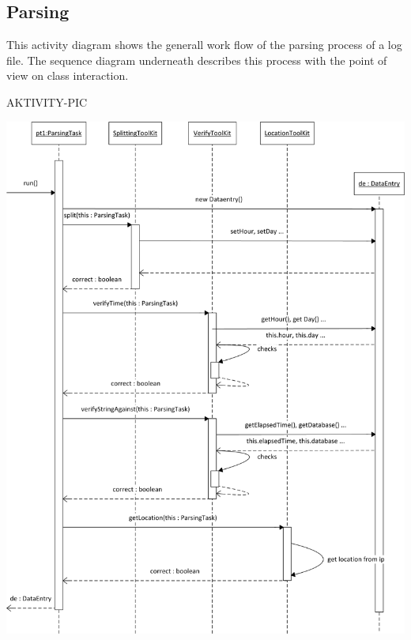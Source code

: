 \newpage 

\subsection{Parsing} 
This activity diagram shows the generall work flow of the parsing process of a log file. 
The sequence diagram underneath describes this process with the point of view on class interaction.

AKTIVITY-PIC

\begin{center}
\includegraphics[width=0.7\linewidth]{Pictures/Seq/SeqParser.png}
\end{center}



    

